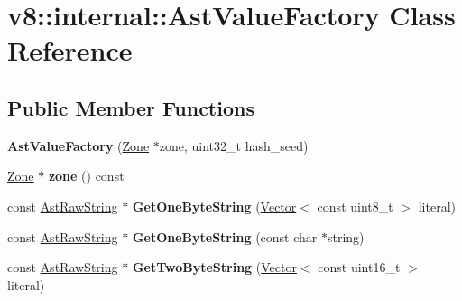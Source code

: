 \hypertarget{classv8_1_1internal_1_1_ast_value_factory}{}\section{v8\+:\+:internal\+:\+:Ast\+Value\+Factory Class Reference}
\label{classv8_1_1internal_1_1_ast_value_factory}
\subsection*{Public Member Functions}
\begin{DoxyCompactItemize}
\item 
{\bfseries Ast\+Value\+Factory} (\hyperlink{classv8_1_1internal_1_1_zone}{Zone} $\ast$zone, uint32\+\_\+t hash\+\_\+seed)\hypertarget{classv8_1_1internal_1_1_ast_value_factory_a70127bc521314ac55105a1725819c8c1}{}\label{classv8_1_1internal_1_1_ast_value_factory_a70127bc521314ac55105a1725819c8c1}

\item 
\hyperlink{classv8_1_1internal_1_1_zone}{Zone} $\ast$ {\bfseries zone} () const \hypertarget{classv8_1_1internal_1_1_ast_value_factory_a38655c4e34eea0f31f9e0252cebf0091}{}\label{classv8_1_1internal_1_1_ast_value_factory_a38655c4e34eea0f31f9e0252cebf0091}

\item 
const \hyperlink{classv8_1_1internal_1_1_ast_raw_string}{Ast\+Raw\+String} $\ast$ {\bfseries Get\+One\+Byte\+String} (\hyperlink{classv8_1_1internal_1_1_vector}{Vector}$<$ const uint8\+\_\+t $>$ literal)\hypertarget{classv8_1_1internal_1_1_ast_value_factory_a2474bab6fd2ffbb9b02058a058a146e6}{}\label{classv8_1_1internal_1_1_ast_value_factory_a2474bab6fd2ffbb9b02058a058a146e6}

\item 
const \hyperlink{classv8_1_1internal_1_1_ast_raw_string}{Ast\+Raw\+String} $\ast$ {\bfseries Get\+One\+Byte\+String} (const char $\ast$string)\hypertarget{classv8_1_1internal_1_1_ast_value_factory_a4de86ce5c6002dec8cd8e441a36871ac}{}\label{classv8_1_1internal_1_1_ast_value_factory_a4de86ce5c6002dec8cd8e441a36871ac}

\item 
const \hyperlink{classv8_1_1internal_1_1_ast_raw_string}{Ast\+Raw\+String} $\ast$ {\bfseries Get\+Two\+Byte\+String} (\hyperlink{classv8_1_1internal_1_1_vector}{Vector}$<$ const uint16\+\_\+t $>$ literal)\hypertarget{classv8_1_1internal_1_1_ast_value_factory_ac6cec94eb0417d5570d238e1f5a74504}{}\label{classv8_1_1internal_1_1_ast_value_factory_ac6cec94eb0417d5570d238e1f5a74504}


\end{DoxyCompactItemize}
